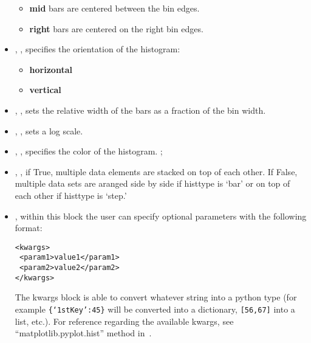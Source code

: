 \begin{itemize}
\begin{itemize}
    \item \textbf{mid} bars are centered between the bin edges.
    \item \textbf{right} bars are centered on the right bin edges.
  \end{itemize}
  \item {}, , specifies the
  orientation of the histogram:
  \begin{itemize}
    \item \textbf{horizontal}
    \item \textbf{vertical}
  \end{itemize}
  \item {}, , sets the relative
  width of the bars as a fraction of the bin width.
  \item {}, , sets a log scale.
  \item {}, , specifies the color
  of the histogram.
  ;
  \item {}, , if True, multiple
  data elements are stacked on top of each other. If False, multiple data sets
  are aranged side by side if histtype is `bar' or on top of each other if
  histtype is `step.'
  \item {}, within this block the user can specify optional
  parameters with the following format:

\begin{lstlisting}[style=XML]
<kwargs>
 <param1>value1</param1>
 <param2>value2</param2>
</kwargs>
\end{lstlisting}
  The kwargs block is able to convert whatever string into a python type (for
  example  \texttt{\{`1stKey':45\}} will
  be converted into a dictionary,
  \texttt{[56,67]}  into a list, etc.).
  For reference regarding the available kwargs, see ``matplotlib.pyplot.hist''
  method in~\cite{MatPlotLib}.
    \end{itemize}

